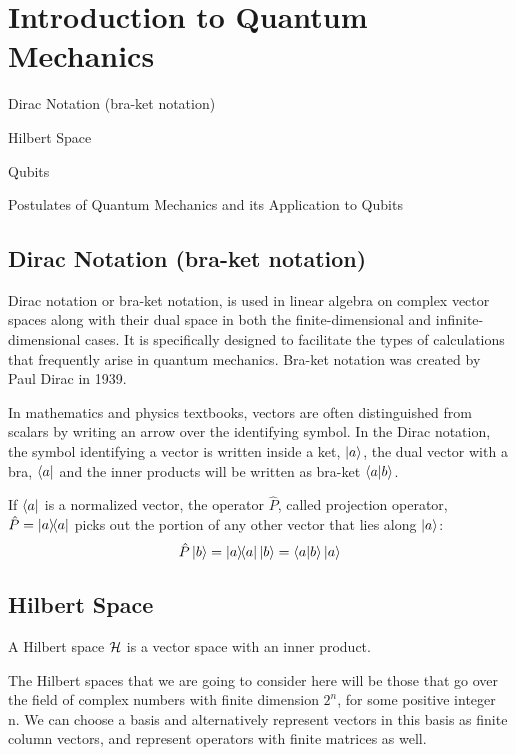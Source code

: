 \section{Introduction to Quantum Mechanics}
\begin{introduction}
	\item Dirac Notation (bra-ket notation)
	\item Hilbert Space
	\item Qubits
	\item Postulates of Quantum Mechanics and its Application to Qubits
\end{introduction}

\subsection{Dirac Notation (bra-ket notation)}

Dirac notation or bra-ket notation, is used in linear algebra on complex vector spaces along with their dual space in both the finite-dimensional and infinite-dimensional cases.
It is specifically designed to facilitate the types of calculations that frequently arise in quantum mechanics.
Bra-ket notation was created by Paul Dirac in 1939.

In mathematics and physics textbooks, vectors are often distinguished from scalars by writing an arrow over the identifying symbol.
In the Dirac notation, the symbol identifying a vector is written inside a ket, $\ket{a}$, the dual vector with a bra, $\bra{a}$ and the inner products will be written as bra-ket $\braket{a}{b}$.

If $\bra{a}$ is a normalized vector, the operator $\hat{P}$, called projection operator, $\hat{P}=\ketbra{a}{a}$ picks out the portion of any other vector that lies along $\ket{a}$:
\begin{equation*}
	\hat{P}\ket{b}=\ketbra{a}{a}\ket{b}=\braket{a}{b}\ket{a}
\end{equation*}

\subsection{Hilbert Space}

A Hilbert space $\mathcal{H}$ is a vector space with an inner product.

The Hilbert spaces that we are going to consider here will be those that go over the field of complex numbers with  finite dimension $2^n$, for some positive integer n.
We can choose a basis and alternatively represent vectors in this basis as finite column vectors, and represent operators with finite matrices as well.


